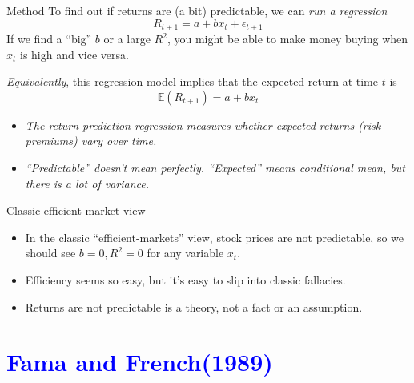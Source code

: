 \documentclass{beamer}
\begin{document}
\begin{frame}{Method}
	To find out if returns are (a bit) predictable, we can \textit{run a regression}
	\begin{equation}
		R_{t+1} = a + bx_t + \epsilon_{t+1}
	\end{equation}
If we find a ``big'' $b$ or a large $R^2$, you might be able to make money buying when $x_t$ is high and vice versa. 

\textit{Equivalently}, this regression model implies that the expected return at time $t$ is 
\begin{equation}
	\mathbb{E}(R_{t+1}) = a + bx_t
\end{equation}

\begin{itemize}
	\item \textit{The return prediction regression measures whether expected returns (risk premiums) vary over time.}
	\item \textit{``Predictable'' doesn't mean perfectly. ``Expected'' means conditional mean, but there is a lot of variance.}
\end{itemize}
\end{frame}

\begin{frame}{Classic efficient market view}
	\begin{itemize}
		\item In the classic ``efficient-markets'' view, stock prices are not predictable, so we should see $b = 0, R^2 = 0$ for any variable $x_t$.
		\item Efficiency seems so easy, but it's easy to slip into classic fallacies.
		\item Returns are not predictable is a \alert{theory}, not a fact or an assumption.
	\end{itemize}
\end{frame}

\section{\textcolor{blue}{Fama and French(1989)}}
\end{document}
